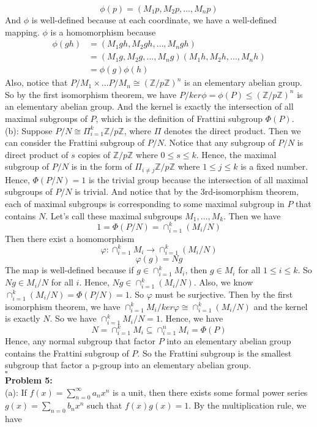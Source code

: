 \documentclass[12pt]{amsart}
\newcommand{\Z}{\mathbb{Z}}
\begin{document}
\[\phi(p)=(M_1p,M_2p,\dots,M_np)\]
And $\phi$ is well-defined because at each coordinate, we have a well-defined mapping. $\phi$ is a homomorphism because 
\begin{align*}
    \phi(gh)&=(M_1gh,M_2gh,\dots,M_ngh)\\
    &=  (M_1g,M_2g,\dots,M_ng)(M_1h,M_2h,\dots,M_nh)\\
    &=\phi(g)\phi(h)
\end{align*}
Also, notice that $P/M_1\times \dots P/M_n\cong (\Z/p\Z)^n$ is an elementary abelian group. So by the first isomorphism theorem, we have $P/ker\phi=\phi(P)\leq (\Z/p\Z)^n$ is an elementary abelian group. And the kernel is exactly the intersection of all maximal subgroups of $P$, which is the definition of Frattini subgroup $\Phi(P)$.\\
(b): Suppose $P/N\cong \Pi_{i=1}^k \Z/p\Z$, where $\Pi$ denotes the direct product. Then we can consider the Frattini subgroup of $P/N$. Notice that any subgroup of $P/N$ is direct product of $s$ copies of $\Z/p\Z$ where $0\leq s\leq k$. Hence, the maximal subgroup of $P/N$ is in the form of $\Pi_{i\neq j}\Z/p\Z$ where $1\leq j\leq k$ is a fixed number. Hence, $\Phi(P/N)=1$ is the trivial group because the intersection of all maximal subgroups of $P/N$ is trivial. And notice that by the 3rd-isomorphism theorem, each of maximal subgroups is corresponding to some maximal subgroup in $P$ that contains $N$. Let's call these maximal subgroups $M_1,\dots, M_k$. Then we have 
\[1=\Phi(P/N)=\cap_{i=1}^k (M_i/N)\]
Then there exist a homomorphism 
\[\varphi:\cap_{i=1}^k M_i\to \cap_{i=1}^k (M_i/N)\]
\[\varphi(g)=Ng\]
The map is well-defined because if $g\in \cap_{i=1}^k M_i$, then $g\in M_i$ for all $1\leq i \leq k$. So $Ng\in M_i/N$ for all $i$. Hence, $Ng\in \cap_{i=1}^k (M_i/N)$. Also, we know $\cap_{i=1}^k (M_i/N)=\Phi(P/N)=1$. So $\varphi$ must be surjective. Then by the first isomorphism theorem, we have $\cap_{i=1}^k M_i/ker\varphi\cong \cap_{i=1}^k (M_i/N)$ and the kernel is exactly $N$. So we have $\cap_{i=1}^k M_i/N=1$. Hence, we have $$N=\cap_{i=1}^k M_i\subseteq \cap_{i=1}^n M_i=\Phi(P)$$
Hence, any normal subgroup that factor $P$ into an elementary abelian group contains the Frattini subgroup of $P$. So the Frattini subgroup is the smallest subgroup that factor a p-group into an elementary abelian group.
\\\phantom{qed}\hfill$\square$\\
\textbf{Problem 5:}\\
(a): If $f(x)=\sum_{n=0}^\infty a_nx^n$ is a unit, then there exists some formal power series $g(x)=\sum_{n=0}b_nx^n$ such that $f(x)g(x)=1$. By the multiplication rule, we have 
\end{document}
